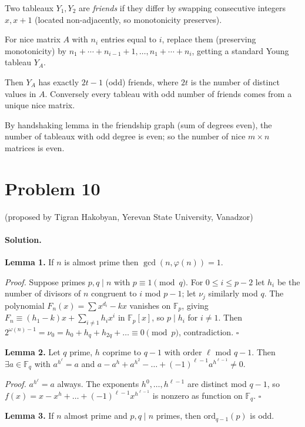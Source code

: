 \documentclass{article}
\begin{document}
Two tableaux $Y_1, Y_2$ are \emph{friends} if they differ by swapping consecutive integers $x, x+1$ (located non-adjacently, so monotonicity preserves).

For nice matrix $A$ with $n_i$ entries equal to $i$, replace them (preserving monotonicity) by $n_1 + \cdots + n_{i-1}+1, \ldots, n_1+\cdots+n_i$, getting a standard Young tableau $Y_A$.

Then $Y_A$ has exactly $2t-1$ (odd) friends, where $2t$ is the number of distinct values in $A$. Conversely every tableau with odd number of friends comes from a unique nice matrix.

By handshaking lemma in the friendship graph (sum of degrees even), the number of tableaux with odd degree is even; so the number of nice $m \times n$ matrices is even.

\section*{Problem 10}
(proposed by Tigran Hakobyan, Yerevan State University, Vanadzor)

\paragraph{Solution.}

\textbf{Lemma 1.} If $n$ is almost prime then $\gcd(n, \varphi(n)) = 1$.

\emph{Proof.} Suppose primes $p, q \mid n$ with $p \equiv 1 \pmod q$. For $0 \leq i \leq p-2$ let $h_i$ be the number of divisors of $n$ congruent to $i$ mod $p-1$; let $\nu_j$ similarly mod $q$. The polynomial $F_n(x) = \sum x^{d_i} - kx$ vanishes on $\mathbb{F}_p$, giving $F_n \equiv (h_1 - k)x + \sum_{i \neq 1} h_i x^i$ in $\mathbb{F}_p[x]$, so $p \mid h_i$ for $i \neq 1$. Then $2^{\omega(n)-1} = \nu_0 = h_0 + h_q + h_{2q} + \ldots \equiv 0 \pmod p$, contradiction. $\square$

\textbf{Lemma 2.} Let $q$ prime, $h$ coprime to $q-1$ with order $\ell$ mod $q-1$. Then $\exists a \in \mathbb{F}_q$ with $a^{h^\ell} = a$ and $a - a^h + a^{h^2} - \ldots + (-1)^{\ell-1} a^{h^{\ell-1}} \neq 0$.

\emph{Proof.} $a^{h^\ell} = a$ always. The exponents $h^0, \ldots, h^{\ell-1}$ are distinct mod $q-1$, so $f(x) = x - x^h + \ldots + (-1)^{\ell-1} x^{h^{\ell-1}}$ is nonzero as function on $\mathbb{F}_q$. $\square$

\textbf{Lemma 3.} If $n$ almost prime and $p, q \mid n$ primes, then $\mathrm{ord}_{q-1}(p)$ is odd.
\end{document}

